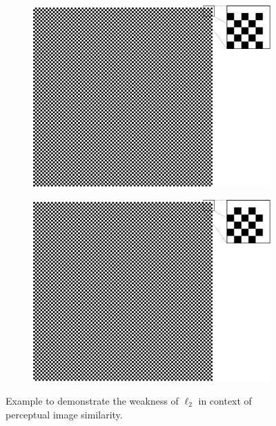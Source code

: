\begin{figure}[htpb]
\centering
\begin{subfigure}{0.5\textwidth}
  \centering
  \includegraphics[width=.8\linewidth]{figures/chess1.pdf}
  \caption{}
  \label{fig:percept-vs-lp1}
\end{subfigure}%
\begin{subfigure}{0.5\textwidth}
  \centering
  \includegraphics[width=.8\linewidth]{figures/chess2.pdf}
  \caption{}
  \label{fig:percept-vs-lp1}
\end{subfigure}
\caption[Example: Weakness of $ \ell_{2} $]{Example to demonstrate the weakness of $ \ell_{2} $ in context of perceptual image similarity.} \label{fig:chessfield}
\end{figure}


